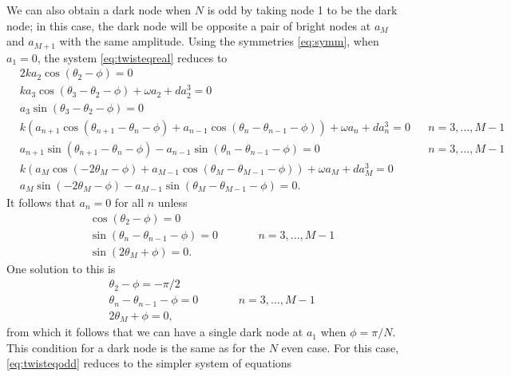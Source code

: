\documentclass[12pt]{article}
\begin{document}
We can also obtain a dark node when $N$ is odd by taking node 1 to be the dark node; in this case, the dark node will be opposite a pair of bright nodes at $a_M$ and $a_{M+1}$ with the same amplitude. Using the symmetries \cref{eq:symm}, when $a_1 = 0$, the system \cref{eq:twisteqreal} reduces to 
\begin{equation}\label{eq:twisteqodd}
\begin{aligned}
&2 k a_2 \cos(\theta_2 - \phi) = 0 \\
&k a_3 \cos(\theta_3-\theta_2-\phi) + \omega a_2 + d a_2^3 = 0 \\
&a_3 \sin(\theta_3-\theta_2-\phi) = 0 \\
&k\left( a_{n+1} \cos(\theta_{n+1}-\theta_n-\phi) + a_{n-1} \cos(\theta_n - \theta_{n-1}-\phi)\right) + \omega a_n + d a_n^3 = 0 && n = 3, \dots, M-1 \\
&a_{n+1} \sin(\theta_{n+1}-\theta_n-\phi) - a_{n-1} \sin(\theta_n - \theta_{n-1}-\phi) = 0 && n = 3, \dots, M-1 \\
&k ( a_M \cos(-2 \theta_M - \phi) + a_{M-1} \cos(\theta_M - \theta_{M-1} - \phi)) + \omega a_M + d a_M^3 = 0 \\
& a_M \sin(-2 \theta_M - \phi) - a_{M-1} \sin(\theta_M - \theta_{M-1} - \phi) = 0.
\end{aligned}
\end{equation}
It follows that $a_n = 0$ for all $n$ unless
\begin{equation}\label{eq:odddarknodecond}
\begin{aligned}
&\cos(\theta_2 - \phi) = 0 \\
&\sin(\theta_{n} - \theta_{n-1} - \phi) = 0 && \qquad n = 3, \dots, M-1 \\
&\sin(2 \theta_M + \phi) = 0.
\end{aligned}
\end{equation}
One solution to this is
\begin{equation}\label{eq:odddarknodecond1}
\begin{aligned}
&\theta_2 - \phi = -\pi/2 \\
&\theta_{n} - \theta_{n-1} - \phi = 0 && \qquad n = 3, \dots, M-1 \\
&2 \theta_M + \phi = 0,
\end{aligned}
\end{equation}
from which it follows that we can have a single dark node at $a_1$ when $\phi = \pi/N$. This condition for a dark node is the same as for the $N$ even case. For this case, \cref{eq:twisteqodd} reduces to the simpler system of equations
\end{document}
